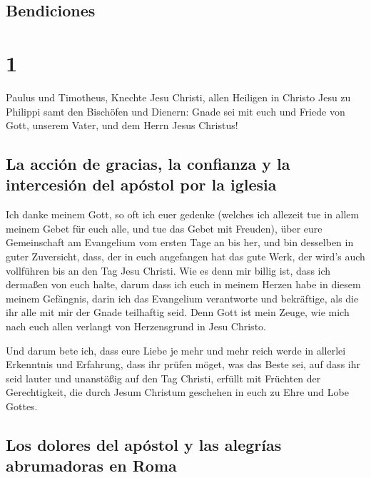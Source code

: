 \hypertarget{bendiciones}{%
\subsection{Bendiciones}\label{bendiciones}}

\hypertarget{section}{%
\section{1}\label{section}}

 Paulus und Timotheus, Knechte Jesu Christi, allen
Heiligen in Christo Jesu zu Philippi samt den Bischöfen und Dienern:
 Gnade sei mit euch und Friede von Gott, unserem Vater,
und dem Herrn Jesus Christus!

\hypertarget{la-acciuxf3n-de-gracias-la-confianza-y-la-intercesiuxf3n-del-apuxf3stol-por-la-iglesia}{%
\subsection{La acción de gracias, la confianza y la intercesión del
apóstol por la
iglesia}\label{la-acciuxf3n-de-gracias-la-confianza-y-la-intercesiuxf3n-del-apuxf3stol-por-la-iglesia}}

 Ich danke meinem Gott, so oft ich euer gedenke
 (welches ich allezeit tue in allem meinem Gebet für euch
alle, und tue das Gebet mit Freuden),  über eure
Gemeinschaft am Evangelium vom ersten Tage an bis her, 
und bin desselben in guter Zuversicht, dass, der in euch angefangen hat
das gute Werk, der wird's auch vollführen bis an den Tag Jesu Christi.
 Wie es denn mir billig ist, dass ich dermaßen von euch
halte, darum dass ich euch in meinem Herzen habe in diesem meinem
Gefängnis, darin ich das Evangelium verantworte und bekräftige, als die
ihr alle mit mir der Gnade teilhaftig seid.  Denn Gott ist
mein Zeuge, wie mich nach euch allen verlangt von Herzensgrund in Jesu
Christo.

 Und darum bete ich, dass eure Liebe je mehr und mehr
reich werde in allerlei Erkenntnis und Erfahrung,  dass
ihr prüfen möget, was das Beste sei, auf dass ihr seid lauter und
unanstößig auf den Tag Christi,  erfüllt mit Früchten der
Gerechtigkeit, die durch Jesum Christum geschehen in euch zu Ehre und
Lobe Gottes.

\hypertarget{los-dolores-del-apuxf3stol-y-las-alegruxedas-abrumadoras-en-roma}{%
\subsection{Los dolores del apóstol y las alegrías abrumadoras en
Roma}\label{los-dolores-del-apuxf3stol-y-las-alegruxedas-abrumadoras-en-roma}}

